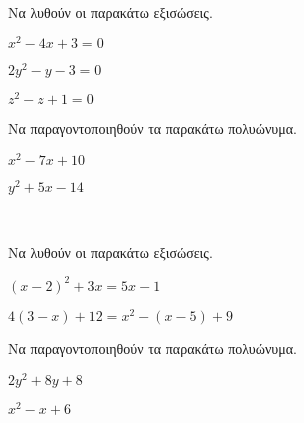 \documentclass[internet]{diag-xelatex}
\begin{document}
\begin{thema}
\item \mbox{}\\\vspace{-7mm}
\begin{erwthma}
\item Να λυθούν οι παρακάτω εξισώσεις.
\begin{multicols}{3}
\begin{rlist}
\item $ x^2-4x+3=0 $
\item $ 2y^2-y-3=0 $
\item $ z^2-z+1=0 $
\end{rlist}
\end{multicols}
\item Να παραγοντοποιηθούν τα παρακάτω πολυώνυμα.
\begin{multicols}{2}
\begin{rlist}
\item $ x^2-7x+10 $
\item $ y^2+5x-14 $
\end{rlist}
\end{multicols}
\end{erwthma}
\item \mbox{}\\\vspace{-7mm}
\begin{erwthma}
\item Να λυθούν οι παρακάτω εξισώσεις.
\begin{multicols}{2}
\begin{rlist}
\item $ (x-2)^2+3x=5x-1 $
\item $ 4(3-x)+12=x^2-(x-5)+9 $
\end{rlist}
\end{multicols}
\item Να παραγοντοποιηθούν τα παρακάτω πολυώνυμα.
\begin{multicols}{2}
\begin{rlist}
\item $ 2y^2+8y+8 $
\item $ x^2-x+6 $
\end{rlist}
\end{multicols}
\end{erwthma}
\item \mbox{}\\\vspace{-7mm}
\begin{erwthma}

\end{erwthma}
\end{thema}
\end{document}
